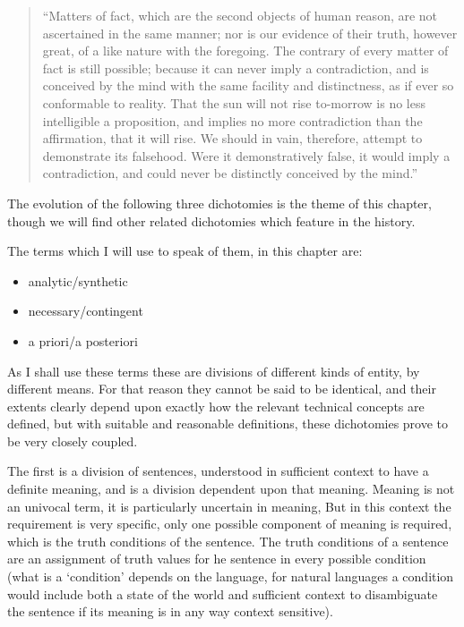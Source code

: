 \begin{quote}
``Matters of fact, which are the second objects of human reason, are not ascertained in the same manner; nor is our evidence of their truth, however great, of a like nature with the foregoing. The contrary of every matter of fact is still possible; because it can never imply a contradiction, and is conceived by the mind with the same facility and distinctness, as if ever so conformable to reality. That the sun will not rise to-morrow is no less intelligible a proposition, and implies no more contradiction than the affirmation, that it will rise. We should in vain, therefore, attempt to demonstrate its falsehood. Were it demonstratively false, it would imply a contradiction, and could never be distinctly conceived by the mind.''
\end{quote}

The evolution of the following three dichotomies is the theme of this chapter, though we will find other related dichotomies which feature in the history.

The terms which I will use to speak of them, in this chapter are:
\begin{itemize}
\item{analytic/\-synthetic}
\item{necessary/contingent}
\item{a priori/a posteriori}
\end{itemize}

As I shall use these terms these are divisions of different kinds of
entity, by different means.
For that reason they cannot be said to be identical, and their extents clearly depend upon exactly how the relevant technical concepts are defined, but with suitable and reasonable definitions, these dichotomies prove to be very closely coupled.

The first is a division of sentences, understood in sufficient context
to have a definite meaning, and is a division dependent upon that
meaning.
Meaning is not an univocal term, it is particularly uncertain in meaning,
But in this context the requirement is very specific, only one possible component of meaning is required, which is the truth conditions of the sentence.
The truth conditions of a sentence are an assignment of truth values for he sentence in every possible condition (what is a `condition' depends on the language, for natural languages a condition would include both a state of the world and sufficient context to disambiguate the sentence if its meaning is in any way context sensitive). 

